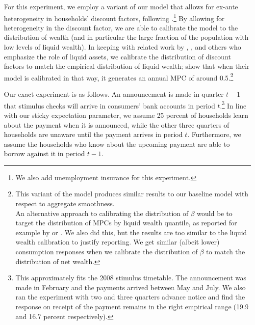 \documentclass[titlepage]{./econtex}
\begin{document}
For this experiment, we employ a variant of our model that allows for ex-ante heterogeneity in households' discount factors, following \cite{cstwMPC}.\footnote{We also add unemployment insurance for this experiment.} By allowing for heterogeneity in the discount factor, we are able to calibrate the model to the distribution of wealth (and in particular the large fraction of the population with low levels of liquid wealth).  In keeping with related work by \cite{kvwWealthyH2m}, \cite{kmvHANK}, and others who emphasize the role of liquid assets, we calibrate the distribution of discount factors to match the empirical distribution of liquid wealth; \cite{cstwMPC} show that when their model is calibrated in that way, it generates an annual MPC of around 0.5.\footnote{This variant of the model produces similar results to our baseline model with respect to aggregate smoothness.\\
An alternative approach to calibrating the distribution of $\beta$ would be to target the distribution of MPCs by liquid wealth quantile, as reported for example by \cite{fhnMPC} or \cite{ckConsumption}. We also did this, but the results are too similar to the liquid wealth calibration to justify reporting.  We get similar (albeit lower) consumption responses when we calibrate the distribution of $\beta$ to match the distribution of net wealth.}

Our exact experiment is as follows.  An announcement is made in quarter $t-1$ that stimulus checks will arrive in consumers' bank accounts in period $t$.\footnote{This approximately fits the 2008 stimulus timetable. The announcement was made in February and the payments arrived between May and July. We also ran the experiment with two and three quarters advance notice and find the response on receipt of the payment remains in the right empirical range (19.9 and 16.7 percent respectively).} In line with our sticky expectation parameter, we assume 25 percent of households learn about the payment when it is announced, while the other three quarters of households are unaware until the payment arrives in period $t$. Furthermore, we assume the households who know about the upcoming payment are able to borrow against it in period $t-1$.
\end{document}
